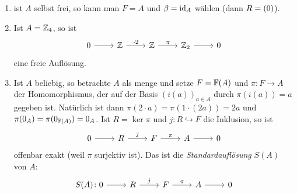 \begin{beispiel}
  \begin{enumerate}
    \item 
      ist $A$ selbst frei, so kann man $F = A$ und $\beta = \operatorname{id}_A$ wählen (dann $R = (0)$).
    \item
      Ist $A = \mathbb{Z}_4$, so ist
      \begin{equation*}
        \begin{tikzcd}
          0 \arrow{r}{}
            & \Z \arrow{r}{\cdot 2}
            & \Z \arrow{r}{\pi}
            & \Z_2 \arrow {r}{}
            & 0
        \end{tikzcd}
      \end{equation*}
      eine freie Auflösung.
    \item
      Ist $A$ beliebig, so betrachte $A$ als menge und setze $F = \mathbb{F}(A)$ und $\pi\colon F \to A$ der Homomorphismus, der auf der Basis ${(i(a))}_{a \in A}$ durch $\pi(i(a)) = a$ gegeben ist.
      Natürlich ist dann $\pi(2 \cdot a) = \pi(1\cdot (2a)) = 2a$ und $\pi(0_A) = \pi(0_{\mathbb{F}(A)}) = 0_A$.
      Ist $R = \ker \pi$ und $j\colon R \hookrightarrow F$ die Inklusion, so ist
      \begin{equation*}
        \begin{tikzcd}
          0 \arrow{r}{}
            & R \arrow{r}{j} 
            & F \arrow{r}{\pi}
            & A \arrow{r}{}
            & 0
        \end{tikzcd}
      \end{equation*}
      offenbar exakt (weil $\pi$ surjektiv ist).
      Das ist die \emph{Standardauflösung} $S(A)$ von $A$:
      \begin{equation*}
        \begin{tikzcd}
          S(A)\colon
          0 \arrow{r}{}
            & R \arrow{r}{j} 
            & F \arrow{r}{\pi}
            & A \arrow{r}{}
            & 0
        \end{tikzcd}
      \end{equation*}
  \end{enumerate}
\end{beispiel}
